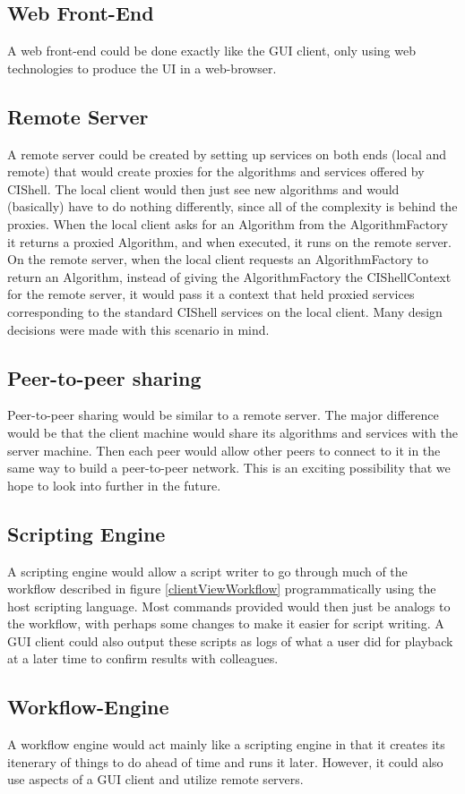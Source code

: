 \documentclass[a4]{article}
\begin{document}
\subsection{Web Front-End}

A web front-end could be done exactly like the GUI client, only using web
technologies to produce the UI in a web-browser.

\subsection{Remote Server}
\label{RemoteServer}

A remote server could be created by setting up services on both ends (local and 
remote) that would create proxies for the algorithms and services offered by 
CIShell. The local client would then just see new algorithms and would 
(basically) have to do nothing differently, since all of the complexity is 
behind the proxies. When the local client asks for an Algorithm from the 
AlgorithmFactory it returns a proxied Algorithm, and when executed, it runs on 
the remote server. On the remote server, when the local client requests an 
AlgorithmFactory to return an Algorithm, instead of giving the AlgorithmFactory 
the CIShellContext for the remote server, it would pass it a context that held 
proxied services corresponding to the standard CIShell services on the local 
client. Many design decisions were made with this scenario in mind.

\subsection{Peer-to-peer sharing}

Peer-to-peer sharing would be similar to a remote server. The major difference
would be that the client machine would share its algorithms and services with
the server machine. Then each peer would allow other peers to connect to it in
the same way to build a peer-to-peer network. This is an exciting possibility
that we hope to look into further in the future.

\subsection{Scripting Engine}

A scripting engine would allow a script writer to go through much of the
workflow described in figure \ref{clientViewWorkflow} programmatically using the
host scripting language. Most commands provided would then just be analogs to
the workflow, with perhaps some changes to make it easier for script writing. A
GUI client could also output these scripts as logs of what a user did for
playback at a later time to confirm results with colleagues.

\subsection{Workflow-Engine}

A workflow engine would act mainly like a scripting engine in that it creates
its itenerary of things to do ahead of time and runs it later. However, it could
also use aspects of a GUI client and utilize remote servers.
\end{document}
